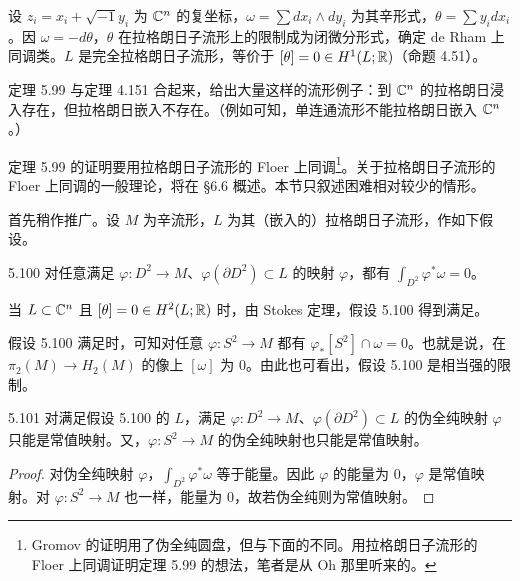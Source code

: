 设 $z_i=x_i+\sqrt{-1}y_i$ 为 $\mathbb{C}^n$ 的复坐标，$\omega=\sum dx_i\wedge dy_i$ 为其辛形式，$\theta=\sum y_idx_i$。因 $\omega=-d\theta$，$\theta$ 在拉格朗日子流形上的限制成为闭微分形式，确定 de Rham 上同调类。$L$ 是完全拉格朗日子流形，等价于 $[\theta]=0\in H^1(L;\mathbb{R})$（命题 4.51）。

定理 5.99 与定理 4.151 合起来，给出大量这样的流形例子：到 $\mathbb{C}^n$ 的拉格朗日浸入存在，但拉格朗日嵌入不存在。（例如可知，单连通流形不能拉格朗日嵌入 $\mathbb{C}^n$。）

定理 5.99 的证明要用拉格朗日子流形的 Floer 上同调\footnote{Gromov 的证明用了伪全纯圆盘，但与下面的不同。用拉格朗日子流形的 Floer 上同调证明定理 5.99 的想法，笔者是从 Oh 那里听来的。}。关于拉格朗日子流形的 Floer 上同调的一般理论，将在 §6.6 概述。本节只叙述困难相对较少的情形。

首先稍作推广。设 $M$ 为辛流形，$L$ 为其（嵌入的）拉格朗日子流形，作如下假设。

\begin{assumption}{5.100}
  对任意满足 $\varphi\colon D^2\to M$、$\varphi(\partial D^2)\subset L$ 的映射 $\varphi$，都有 $\int_{D^2}\varphi^*\omega=0$。
\end{assumption}

当 $L\subset\mathbb{C}^n$ 且 $[\theta]=0\in H^2(L;\mathbb{R})$ 时，由 Stokes 定理，假设 5.100 得到满足。

假设 5.100 满足时，可知对任意 $\varphi\colon S^2\to M$ 都有 $\varphi_*[S^2]\cap\omega=0$。也就是说，在 $\pi_2(M)\to H_2(M)$ 的像上 $[\omega]$ 为 0。由此也可看出，假设 5.100 是相当强的限制。

\begin{lemma*}{5.101}
  对满足假设 5.100 的 $L$，满足 $\varphi\colon D^2\to M$、$\varphi(\partial D^2)\subset L$ 的伪全纯映射 $\varphi$ 只能是常值映射。又，$\varphi\colon S^2\to M$ 的伪全纯映射也只能是常值映射。
\end{lemma*}

\begin{proof}
  对伪全纯映射 $\varphi$，$\int_{D^2}\varphi^*\omega$ 等于能量。因此 $\varphi$ 的能量为 0，$\varphi$ 是常值映射。对 $\varphi\colon S^2\to M$ 也一样，能量为 0，故若伪全纯则为常值映射。
\end{proof}

